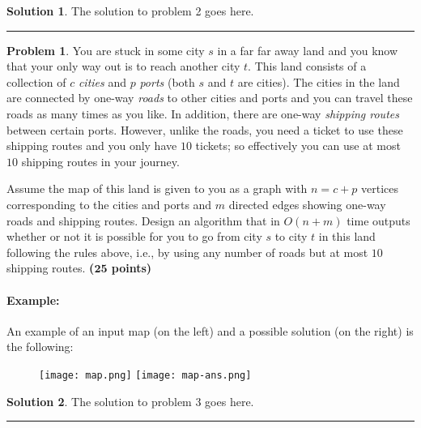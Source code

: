 \documentclass{article}
\theoremstyle{definition}
\newtheorem{problem}{Problem}
\def\fline{\rule{0.75\linewidth}{0.5pt}}
\newcommand{\finishline}{\begin{center}\fline\end{center}}
\newtheorem*{solution*}{Solution}
\newenvironment{solution}{\begin{solution*}}{{\finishline} \end{solution*}}
\newcommand{\grade}[1]{\hfill{\textbf{($\mathbf{#1}$ points)}}}
\begin{document}
\begin{solution}
 The solution to problem 2 goes here. 
\end{solution}

\bigskip

\begin{problem}
	You are stuck in some city $s$ in a far far away land and you know that your only way out is to reach another city $t$. This land consists of a collection of $c$ \emph{cities} and $p$ \emph{ports} (both $s$ and $t$ are cities). The cities in the land are connected by one-way \emph{roads} to other cities and ports and you can travel these roads as many times as you like. In addition, there are one-way \emph{shipping routes} between certain ports. However, unlike the roads, you need a ticket to use these shipping routes and you only have $10$ tickets; so effectively you can use at most $10$ shipping routes in your journey. 
	
	Assume the map of this land is given to you as a graph with $n = c + p$ vertices corresponding to the cities and ports and $m$ directed edges showing one-way roads and shipping routes. Design an algorithm that in $O(n+m)$ time outputs whether  or not it is possible for you to go from city $s$ to city $t$ in this land following the rules above, i.e., by using any number of roads but at most $10$ shipping routes. \grade{25}
	
	\paragraph{Example:} An example of an input map (on the left) and a possible solution (on the right) is the following: 

\begin{figure}[h!]
\centering
\texttt{[image: map.png]} \hspace{-0.15cm}
\texttt{[image: map-ans.png]} ~ 
\end{figure}

\end{problem}

\begin{solution}
 The solution to problem 3 goes here. 
\end{solution}

\medskip
\end{document}
